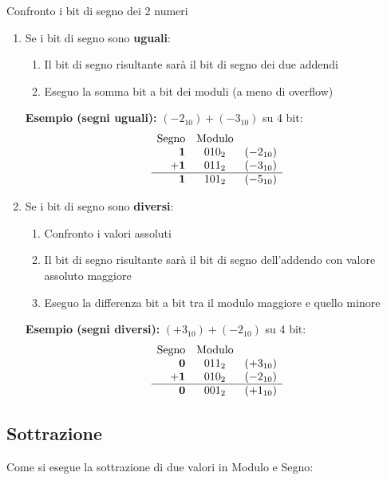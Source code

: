 Confronto i bit di segno dei 2 numeri
\begin{enumerate}
    \item Se i bit di segno sono \textbf{uguali}:
    \begin{enumerate}[label=\theenumi.\arabic*.]
        \item Il bit di segno risultante sarà il bit di segno dei due addendi
        \item Eseguo la somma bit a bit dei moduli (a meno di overflow)
    \end{enumerate}
    
    \textbf{Esempio (segni uguali):} $(-2_{10}) + (-3_{10})$ su 4 bit:
    \[
    \begin{array}{r@{\quad}c@{\quad}l}
      \text{Segno} & \text{Modulo} & \\
      \mathbf{1} & 010_2 & (-2_{10}) \\
    + \mathbf{1} & 011_2 & (-3_{10}) \\
    \hline
      \mathbf{1} & 101_2 & (-5_{10})
    \end{array}
    \]

    \item Se i bit di segno sono \textbf{diversi}:
    \begin{enumerate}[label=\theenumi.\arabic*.]
        \item Confronto i valori assoluti
        \item Il bit di segno risultante sarà il bit di segno dell'addendo con valore assoluto maggiore
        \item Eseguo la differenza bit a bit tra il modulo maggiore e quello minore
    \end{enumerate}

    \textbf{Esempio (segni diversi):} $(+3_{10}) + (-2_{10})$ su 4 bit:
    \[
    \begin{array}{r@{\quad}c@{\quad}l}
      \text{Segno} & \text{Modulo} & \\
      \mathbf{0} & 011_2 & (+3_{10}) \\
    + \mathbf{1} & 010_2 & (-2_{10}) \\
    \hline
      \mathbf{0} & 001_2 & (+1_{10})
    \end{array}
    \]
\end{enumerate}

\subsection{Sottrazione}
Come si esegue la sottrazione di due valori in Modulo e Segno:

